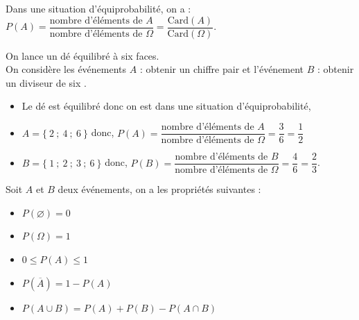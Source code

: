 \begin{prop}{}{}
Dans une situation d'équiprobabilité, on a : $P(A) =\dfrac{\textrm{nombre d'éléments de }A}{\textrm{nombre d'éléments de }\Omega} =\dfrac{\textrm{Card}(A)}{\textrm{Card}(\Omega)}$.
\end{prop}

\begin{ex}{}{}
  On lance un dé équilibré à six faces. \\
  On considère les événements $A$ : \og obtenir un chiffre pair \fg{} et l'événement $B$ : \og obtenir un diviseur de six \fg{}.
   \begin{itemize}
      \item[] Le dé est équilibré donc on est dans une situation d'équiprobabilité,
      \item[] $A=\{~2~;~4~;~6~\}$ \quad donc, $P(A)=\dfrac{\textrm{nombre d'éléments de }A}{\textrm{nombre d'éléments de }\Omega} =\dfrac{3}{6}=\dfrac{1}{2}$
      \item[] $B=\{~1~;~2~;~3~;~6~\}$ \quad donc, $P(B)=\dfrac{\textrm{nombre d'éléments de }B}{\textrm{nombre d'éléments de }\Omega} =\dfrac{4}{6}=\dfrac{2}{3}$.
   \end{itemize}
\end{ex}

\begin{prop}{}{}
Soit $A$ et $B$ deux événements, on a les propriétés suivantes :

\begin{minipage}{8cm}
\begin{itemize}
\item  $P(\varnothing)=0$
\item  $P(\Omega)=1$
\end{itemize}
\end{minipage}
\begin{minipage}{9cm}
\begin{itemize}
\item  $0 \leqslant P(A) \leqslant 1$
\item  $P(\overline{A})=1-P(A)$
\item  $P(A\cup B)=P(A)+P(B)-P(A\cap B)$
\end{itemize}
\end{minipage}
\end{prop}

